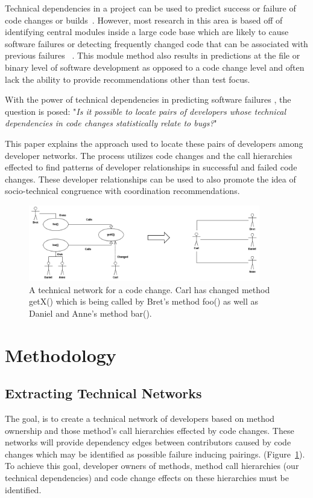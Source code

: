 \documentclass[conference]{IEEEtran}
\begin{document}
Technical dependencies in a project can be used to predict success or failure of 
code changes or builds~\cite{Pinzger:2008:DNP, Zimmermann:2008:PDU}. However, most 
research in this area is based off of identifying
central modules inside a large code base which are likely to cause software failures or
detecting frequently changed code that can be associated with previous failures
~\cite{Kim:2006:AIB}. 
This module method also results in predictions 
at the file or binary level of software development as opposed to a code change level
and often lack the ability to provide recommendations other than test focus.

With the power of technical dependencies in predicting software failures , the question is posed: 
"\textit{Is it possible to locate pairs of developers whose technical dependencies in code changes
statistically relate to bugs?}"

This paper explains the approach used to locate these pairs of developers among developer networks.
The process utilizes code changes and the call hierarchies effected  to find patterns of developer 
relationships in successful and failed code changes.  These developer relationships can be used
to also promote the idea of socio-technical congruence with coordination recommendations.

\begin{figure}[tb!]
\centering
\includegraphics[width=0.9\textwidth]{images/TecNetwork}
\caption{A technical network for a code change. Carl has changed method getX() which is being
called by Bret's method foo() as well as Daniel and Anne's method bar().\label{fig:network}}
\end{figure}

\section{Methodology}

\subsection{Extracting Technical Networks}
The goal, is to create a technical network of developers based on method ownership
and those method's call hierarchies effected by code changes. These networks will provide
dependency edges between contributors caused by code changes which may be 
identified as possible failure inducing pairings. (Figure~\ref{fig:network}). To achieve this goal,
developer owners of methods, method call hierarchies (our technical
dependencies) and code change effects on these hierarchies must be identified.
\end{document}
